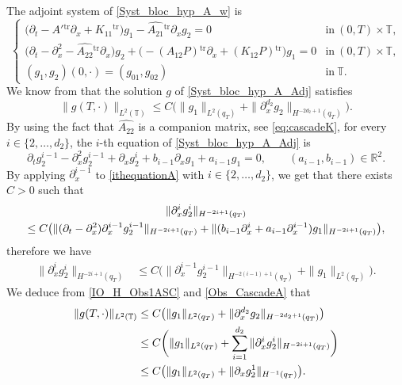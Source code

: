 \documentclass[JEP,XML,SOM,Unicode,NoEqCountersInSection]{cedram}
\theoremstyle{plain}
\theoremstyle{definition}
\theoremstyle{remark}
\newcommand{\set}{\mathbb}
\newcommand{\R}{} %
\renewcommand{\R}{\set{R}}
\newcommand{\T}{\set{T}}
\newcommand{\Tr}[1]{{#1}{}^{\mathrm{tr}}}
\let\originalleft\left
\let\originalright\right
\renewcommand{\left}{\mathopen{}\mathclose\bgroup\originalleft}
\renewcommand{\right}{\aftergroup\egroup\originalright}
\begin{document}
The adjoint system of \eqref{Syst_bloc_hyp_A_w} is
\begin{equation} \label{Syst_bloc_hyp_A_Adj}
\begin{cases}
\bigl(\partial_t -\Tr{A'}\partial_x+\Tr{K_{11}}\bigr)g_1 - \Tr{\widehat{A_{21}}}\partial_x g_2= 0
&\text{in}\ (0,T)\times \T,\!\\
\bigl(\partial_t - \partial_x^2-\Tr{\widehat{A_{22}}}\partial_x\bigr)g_2 +\bigl(-\Tr{(A_{12}P)}\partial_x+\Tr{(K_{12}P)}\bigr)g_1 = 0 &\text{in}\ (0,T)\times \T,\!\\
(g_1,g_2)(0,\cdot)=(g_{01},g_{02}) & \text{in}\ \T.
\end{cases}
\end{equation}
\normalsize
We know from  that the solution $g$ of \eqref{Syst_bloc_hyp_A_Adj} satisfies
\begin{equation} \label{IO_H_Obs1ASC}
\| g(T,\cdot) \|_{L^2(\T)} \leq C \bigl(\| g_1\|_{L^2(q_T)} + \|\partial_{x}^{d_2} g_2\|_{H^{-2d_2+1}(q_T)} \bigr).
\end{equation}
By using the fact that $\widehat{A_{22}}$ is a companion matrix, see \eqref{eq:cascadeK}, for every $i \in \{2, \dots, d_2\}$, the $i$-th equation of \eqref{Syst_bloc_hyp_A_Adj} is
\begin{equation}
\partial_t g_2^{i-1} - \partial_x^2 g_2^{i-1} + \partial_{x} g_2^{i} + b_{i-1} \partial_x g_1+ a_{i-1} g_1 =0,\qquad (a_{i-1}, b_{i-1}) \in \R^2.
\label{ithequationA}
\end{equation}
By applying $\partial_{x}^{i-1}$ to \eqref{ithequationA} with $i \in \{2, \dots, d_2\}$, we get that there exists $C>0$ such that
\begin{multline*}
\|\partial_{x}^{i} g_2^{i}\|_{H^{-2i + 1 }(q_T)}\\
\leq C \left(\|(\partial_t - \partial_{x}^2)\partial_x^{i-1} g_2^{i-1}\|_{H^{-2i+1}(q_T)} + \| (b_{i-1} \partial_x^{i}+ a_{i-1}\partial_{x}^{i-1}) g_1\|_{H^{-2i+1}(q_T)} \right),
\end{multline*}
therefore we have
\begin{align}
\|\partial_{x}^{i} g_2^{i}\|_{H^{-2i + 1 }(q_T)} &\leq C \bigl(\|\partial_x^{i-1} g_2^{i-1}\|_{H^{-2(i-1)+1}(q_T)} + \| g_1\|_{L^2(q_T)} \bigr).
\label{Obs_CascadeA}
\end{align}
We deduce from \eqref{IO_H_Obs1ASC} and \eqref{Obs_CascadeA} that
\begin{equation}\label{IO_H_Obs2A}
\begin{split}
\| g(T,\cdot) \|_{L^2(\T)} & \leq C \left(\| g_1\|_{L^2(q_T)} + \|\partial_{x}^{d_2} g_2\|_{H^{-2d_2+1}(q_T)} \right)\\
& \leq C \biggl(\| g_1\|_{L^2(q_T)} + \sum_{i=1}^{d_2}\|\partial_{x}^{i} g_2^{i}\|_{H^{-2i + 1 }(q_T)} \biggr)\\
&\leq C \bigl(\| g_1\|_{L^2(q_T)} + \|\partial_{x} g_2^1\|_{H^{-1}(q_T)} \bigr).
\end{split}
\end{equation}
\end{document}

